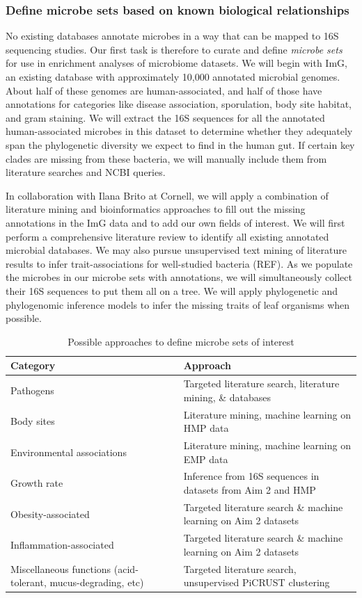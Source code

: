 \documentclass[12pt]{article}
\begin{document}
\subsubsection{Define microbe sets based on known biological relationships}


No existing databases annotate microbes in a way that can be mapped to 16S sequencing studies. Our first task is therefore to curate and define \textit{microbe sets} for use in enrichment analyses of microbiome datasets. We will begin with ImG, an existing database with approximately 10,000 annotated microbial genomes. About half of these genomes are human-associated, and half of those have annotations for categories like disease association, sporulation, body site habitat, and gram staining. We will extract the 16S sequences for all the annotated human-associated microbes in this dataset to determine whether they adequately span the phylogenetic diversity we expect to find in the human gut. If certain key clades are missing from these bacteria, we will manually include them from literature searches and NCBI queries.

In collaboration with Ilana Brito at Cornell, we will apply a combination of literature mining and bioinformatics approaches to fill out the missing annotations in the ImG data and to add our own fields of interest. We will first perform a comprehensive literature review to identify all existing annotated microbial databases. We may also pursue unsupervised text mining of literature results to infer trait-associations for well-studied bacteria (REF). As we populate the microbes in our microbe sets with annotations, we will simultaneously collect their 16S sequences to put them all on a tree. We will apply phylogenetic and phylogenomic inference models to infer the missing traits of leaf organisms when possible.

\begin{table}
\begin{tabular}{|p{6cm}|p{10cm}|}
	\hline
	\textbf{Category} & \textbf{Approach} \\
	\hline
	Pathogens & Targeted literature search, literature mining, \& databases \\
	\hline
	Body sites & Literature mining, machine learning on HMP data \\
	\hline
	Environmental associations & Literature mining, machine learning on EMP data \\
	\hline
	Growth rate & Inference from 16S sequences in datasets from Aim 2 and HMP \\
	\hline
	Obesity-associated & Targeted literature search \& machine learning on Aim 2 datasets \\
	\hline
	Inflammation-associated & Targeted literature search \& machine learning on Aim 2 datasets \\
	\hline
	Miscellaneous functions (acid-tolerant, mucus-degrading, etc) & Targeted literature search, unsupervised PiCRUST clustering \\
	\hline 
\end{tabular}
\caption{Possible approaches to define microbe sets of interest}\label{tab:microbe_set_categories}
\end{table}
\end{document}
